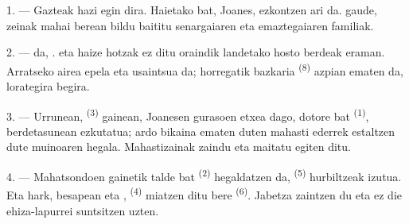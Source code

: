 %
%

\VUsaut{4.0mm}
\VUsaut{1.6mm}
\VUsaut{3.2mm}

\VUsaut{1.6mm}
\VUsaut{2.6mm}

\VUsaut{3.0mm}

1. --- Gazteak hazi egin dira. Haietako bat, Joanes, ezkontzen ari da.
 gaude, zeinak mahai berean bildu baititu senargaiaren
eta emaztegaiaren familiak.

2. ---  da, .  eta
 haize hotzak ez ditu oraindik landetako hosto berdeak eraman.
Arratseko airea epela eta usaintsua da; horregatik bazkaria 
\textsuperscript{(8)} azpian ematen da, lorategira begira.

3. --- Urrunean,  \textsuperscript{(3)} gainean, Joanesen
gurasoen etxea dago,  dotore bat \textsuperscript{(1)},
berdetasunean ezkutatua; ardo bikaina ematen duten mahasti ederrek estaltzen dute
muinoaren hegala. Mahastizainak zaindu eta maitatu egiten ditu.

4. --- Mahatsondoen gainetik  talde bat \textsuperscript{(2)}
hegaldatzen da,  \textsuperscript{(5)} hurbiltzeak izutua.
Eta hark,  besapean eta ,
 \textsuperscript{(4)} miatzen ditu bere 
\textsuperscript{(6)}. Jabetza zaintzen du eta ez die ehiza-lapurrei
 suntsitzen uzten.

